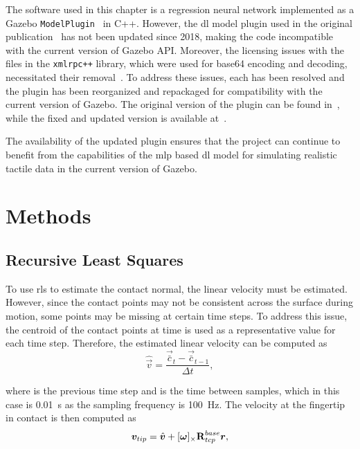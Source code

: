 The software used in this chapter is a regression neural network implemented as a Gazebo \texttt{ModelPlugin}~\cite{gazebo-model-plugin} in C++. However, the \gls{dl} model plugin used in the original publication~\cite{simulation-of-the-syntouch-biotac-sensor} has not been updated since \num{2018}, making the code incompatible with the current version of Gazebo API. Moreover, the licensing issues with the files in the \texttt{xmlrpc++} library, which were used for base64 encoding and decoding, necessitated their removal~\cite{base64-encoding-decoding-licensing-issue}. To address these issues, each has been resolved and the plugin has been reorganized and repackaged for compatibility with the current version of Gazebo. The original version of the plugin can be found in~\cite{ruppel-philipp-biotac-gazebo-plugin}, while the fixed and updated version is available at~\cite{melbye-staven-biotac-sim-plugin}. \medskip

The availability of the updated plugin ensures that the project can continue to benefit from the capabilities of the \gls{mlp} based \gls{dl} model for simulating realistic tactile data in the current version of Gazebo.

\section{Methods}\label{sec:1-tactile-perception-method}

\subsection{Recursive Least Squares}\label{sec:1-tactile-perception-recirsive-least-squares}

To use \gls{rls} to estimate the contact normal, the linear velocity  must be estimated. However, since the contact points may not be consistent across the surface during motion, some points may be missing at certain time steps. To address this issue, the centroid of the contact points  at time  is used as a representative value for each time step. Therefore, the estimated linear velocity can be computed as
%
\begin{equation} \label{eq:v-estimate}
	\hat{\vec{v}} = \frac{\vec{\bar{c}}_{t} - \vec{\bar{c}}_{t-1}}{\Delta t},
\end{equation}

where  is the previous time step and  is the time between samples, which in this case is \SI{0.01}{s} as the sampling frequency is \SI{100}{\hertz}. The velocity at the fingertip in contact is then computed as
%
\begin{equation} \label{eq:v-tip-def}
	\vec{v}_{tip} = \hat{\vec{v}} + [\bm{\omega}]_\times \rot[R]{base}{tcp} \vec{r},
\end{equation}

